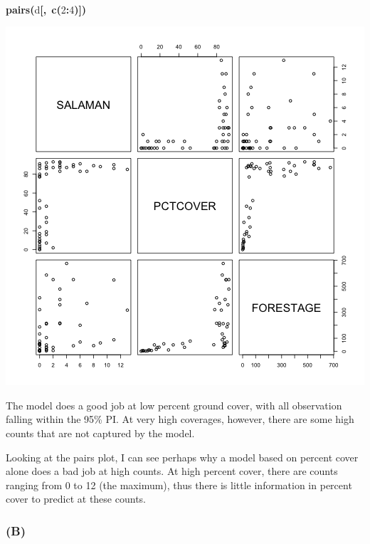 \documentclass{article}
\makeatletter
\newcommand{\hlnumber}[1]{\textcolor[rgb]{0,0,0}{#1}}%
\newcommand{\hlfunctioncall}[1]{\textcolor[rgb]{.5,0,.33}{\textbf{#1}}}%
\newcommand{\hlkeyword}[1]{\textbf{#1}}%
\newcommand{\hlsymbol}[1]{#1}%
\newcommand{\hlstd}[1]{\textcolor[rgb]{0,0,0}{#1}}%
\newenvironment{kframe}{%
 \def\FrameCommand##1{\hskip\@totalleftmargin \hskip-\fboxsep
 \colorbox{shadecolor}{##1}\hskip-\fboxsep
     \hskip-\linewidth \hskip-\@totalleftmargin \hskip\columnwidth}%
 \MakeFramed {\advance\hsize-\width
   \@totalleftmargin\z@ \linewidth\hsize
   \@setminipage}}%
 {\par\unskip\endMakeFramed}
\newenvironment{knitrout}{}{} %
\makeatother
\begin{document}
\begin{knitrout}
{\begin{kframe}
\begin{flushleft}
\ttfamily\noindent
\hspace*{\fill}\\
\hlstd{}\hlfunctioncall{pairs}\hlkeyword{(}\hlsymbol{d}\hlkeyword{[}\hlkeyword{,}{\ }\hlfunctioncall{c}\hlkeyword{(}\hlnumber{2}\hlkeyword{:}\hlnumber{4}\hlkeyword{)}\hlkeyword{]}\hlkeyword{)}\mbox{}
\normalfont
\end{flushleft}
\includegraphics{sal-fig2} \end{kframe}}
\end{knitrout}


The model does a good job at low percent ground cover, with all observation falling within the 95\% PI. 
At very high coverages, however, there are some high counts that are not captured by the model.

Looking at the pairs plot, I can see perhaps why a model based on percent cover alone does a bad job at high counts. 
At high percent cover, there are counts ranging from 0 to 12 (the maximum), thus there is little information in percent cover to predict  at these counts. 



\subsubsection*{(B)}
\end{document}
